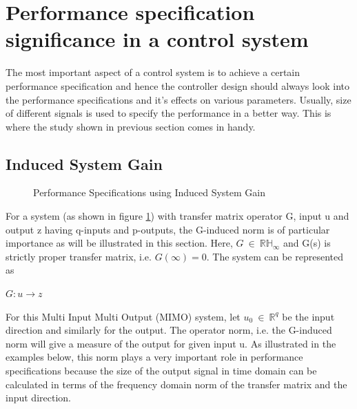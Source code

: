 \documentclass[a4paper,12pt]{article}
\begin{document}
\section{Performance specification significance in a control system} The most important aspect of a control system is to achieve a certain performance specification and hence the controller design should always look into the performance specifications and it's effects on various parameters. Usually, size of different signals is used to specify the performance in a better way. This is where the study shown in previous section comes in handy.
	\subsection{Induced System Gain} 
	\begin{figure}[H]
 
			  \centering
			  
%			  
			  \def\svgscale{0.3}
			  \tiny{
			  
			  }
			  \caption{Performance Specifications using Induced System Gain}
			 \label{perf}
		\end{figure}
	For a system (as shown in figure \ref{perf}) with transfer matrix operator G, input u and output z having q-inputs and p-outputs, the G-induced norm is of particular importance as will be illustrated in this section. Here, $ G \:\in\: \mathbb{R}\mathbb{H}_{\infty} $ and G(s) is strictly proper transfer matrix, i.e. $G(\infty) = 0 $.
	The system can be represented as \\
	\begin{center}
		$G : u \rightarrow z$
	\end{center}
	For this Multi Input Multi Output (MIMO) system, let $u_{0} \: \in \: \mathbb{R}^{q} $ be the input direction and similarly for the output. The operator norm, i.e. the G-induced norm will give a measure of the output for given input u. As illustrated in the examples below, this norm plays a very important role in performance specifications because the size of the output signal in time domain can be calculated in terms of the frequency domain norm of the transfer matrix and the input direction. 
\end{document}
